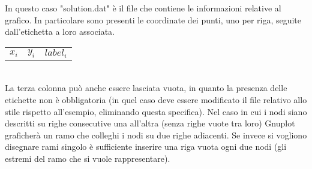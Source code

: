 In questo caso "solution.dat" è il file che contiene le informazioni relative al grafico. In particolare sono presenti le coordinate dei punti, uno per riga, seguite dall'etichetta a loro associata.\\
\begin{table}[h]
\centering
\begin{tabular}{ccc} 
$x_i$         & $y_i$         & $label_i$
\end{tabular}
\end{table}
\\
La terza colonna può anche essere lasciata vuota, in quanto la presenza delle etichette non è obbligatoria (in quel caso deve essere modificato il file relativo allo stile rispetto all'esempio, eliminando questa specifica).
Nel caso in cui i nodi siano descritti su righe consecutive una all'altra (senza righe vuote tra loro) Gnuplot graficherà un ramo che colleghi i nodi su due righe adiacenti. Se invece si vogliono disegnare rami singolo è sufficiente inserire una riga vuota ogni due nodi (gli estremi del ramo che si vuole rappresentare).  






